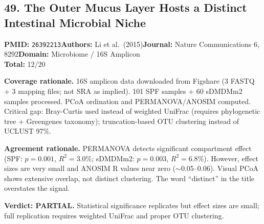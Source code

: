 \subsection{49. The Outer Mucus Layer Hosts a Distinct Intestinal Microbial Niche}
\textbf{PMID:} \texttt{26392213}\quad\textbf{Authors:} Li et al.\ (2015)\quad\textbf{Journal:} Nature Communications 6, 8292\quad\textbf{Domain:} Microbiome / 16S Amplicon\\
\quad{}\quad\textbf{Total:} 12/20\par\smallskip
\noindent\textbf{Coverage rationale.} 16S amplicon data downloaded from Figshare (3 FASTQ + 3 mapping files; not SRA as implied). 101 SPF samples + 60 sDMDMm2 samples processed. PCoA ordination and PERMANOVA/ANOSIM computed. Critical gap: Bray-Curtis used instead of weighted UniFrac (requires phylogenetic tree + Greengenes taxonomy); truncation-based OTU clustering instead of UCLUST 97\%.\par
\noindent\textbf{Agreement rationale.} PERMANOVA detects significant compartment effect (SPF: $p=0.001$, $R^2=3.0\%$; sDMDMm2: $p=0.003$, $R^2=6.8\%$). However, effect sizes are very small and ANOSIM R values near zero ($\sim$0.05--0.06). Visual PCoA shows extensive overlap, not distinct clustering. The word ``distinct'' in the title overstates the signal.\par\smallskip
\noindent\textbf{Verdict: PARTIAL.} Statistical significance replicates but effect sizes are small; full replication requires weighted UniFrac and proper OTU clustering.

